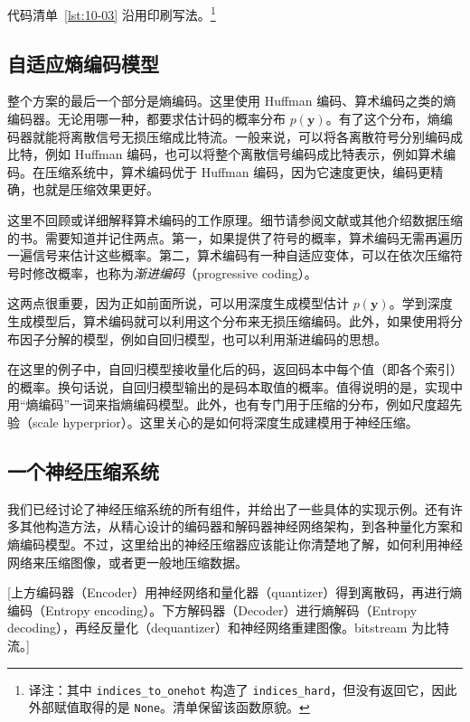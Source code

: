 
代码清单~\ref{lst:10-03} 沿用印刷写法。\footnote{译注：其中 \texttt{indices\_to\_onehot} 构造了 \texttt{indices\_hard}，但没有返回它，因此外部赋值取得的是 \texttt{None}。清单保留该函数原貌。}

\subsection{自适应熵编码模型}

整个方案的最后一个部分是熵编码。这里使用 Huffman 编码、算术编码之类的熵编码器。无论用哪一种，都要求估计码的概率分布 $p(\mathbf y)$。有了这个分布，熵编码器就能将离散信号无损压缩成比特流。一般来说，可以将各离散符号分别编码成比特，例如 Huffman 编码，也可以将整个离散信号编码成比特表示，例如算术编码。在压缩系统中，算术编码优于 Huffman 编码，因为它速度更快，编码更精确，也就是压缩效果更好。

这里不回顾或详细解释算术编码的工作原理。细节请参阅文献或其他介绍数据压缩的书。需要知道并记住两点。第一，如果提供了符号的概率，算术编码无需再遍历一遍信号来估计这些概率。第二，算术编码有一种自适应变体，可以在依次压缩符号时修改概率，也称为\emph{渐进编码}（progressive coding）。

这两点很重要，因为正如前面所说，可以用深度生成模型估计 $p(\mathbf y)$。学到深度生成模型后，算术编码就可以利用这个分布来无损压缩编码。此外，如果使用将分布因子分解的模型，例如自回归模型，也可以利用渐进编码的思想。

在这里的例子中，自回归模型接收量化后的码，返回码本中每个值（即各个索引）的概率。换句话说，自回归模型输出的是码本取值的概率。值得说明的是，实现中用“熵编码”一词来指熵编码模型。此外，也有专门用于压缩的分布，例如尺度超先验（scale hyperprior）。这里关心的是如何将深度生成建模用于神经压缩。


\subsection{一个神经压缩系统}

我们已经讨论了神经压缩系统的所有组件，并给出了一些具体的实现示例。还有许多其他构造方法，从精心设计的编码器和解码器神经网络架构，到各种量化方案和熵编码模型。不过，这里给出的神经压缩器应该能让你清楚地了解，如何利用神经网络来压缩图像，或者更一般地压缩数据。

[上方编码器（Encoder）用神经网络和量化器（quantizer）得到离散码，再进行熵编码（Entropy encoding）。下方解码器（Decoder）进行熵解码（Entropy decoding），再经反量化（dequantizer）和神经网络重建图像。bitstream 为比特流。]

